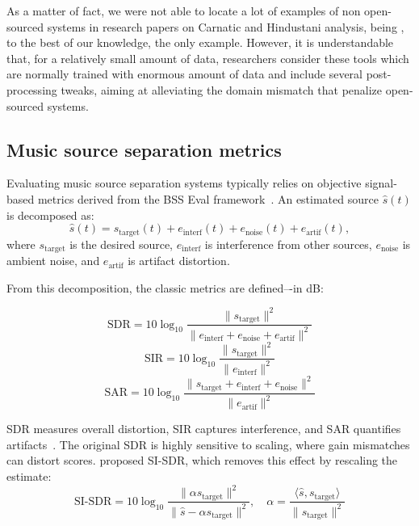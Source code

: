 As a matter of fact, we were not able to locate a lot of examples of non open-sourced systems in research papers on Carnatic and Hindustani analysis, being \citep{bhake-expressive}, to the best of our knowledge, the only example. However, it is understandable that, for a relatively small amount of data, researchers consider these tools which are normally trained with enormous amount of data and include several post-processing tweaks, aiming at alleviating the domain mismatch that penalize open-sourced systems.





\subsection{Music source separation metrics}\label{sec:source_separation_metrics}

Evaluating music source separation systems typically relies on objective signal-based metrics derived from the BSS Eval framework~\citep{vincent-metrics}. An estimated source $\hat{s}(t)$ is decomposed as:
\begin{equation}
    \hat{s}(t) = s_{\mathrm{target}}(t) + e_{\mathrm{interf}}(t) + e_{\mathrm{noise}}(t) + e_{\mathrm{artif}}(t),
\end{equation}
where $s_{\mathrm{target}}$ is the desired source, $e_{\mathrm{interf}}$ is interference from other sources, $e_{\mathrm{noise}}$ is ambient noise, and $e_{\mathrm{artif}}$ is artifact distortion.

From this decomposition, the classic metrics are defined–-in dB:

\begin{equation}
    \mathrm{SDR} = 10\log_{10} \frac{\|s_{\mathrm{target}}\|^2}{\|e_{\mathrm{interf}} + e_{\mathrm{noise}} + e_{\mathrm{artif}}\|^2}
\end{equation}
\begin{equation}
    \mathrm{SIR} = 10\log_{10} \frac{\|s_{\mathrm{target}}\|^2}{\|e_{\mathrm{interf}}\|^2}
\end{equation}
\begin{equation}
    \mathrm{SAR} = 10\log_{10} \frac{\|s_{\mathrm{target}} + e_{\mathrm{interf}} + e_{\mathrm{noise}}\|^2}{\|e_{\mathrm{artif}}\|^2}
\end{equation}

SDR measures overall distortion, SIR captures interference, and SAR quantifies artifacts~\citep{vincent-metrics}.
%
The original SDR is highly sensitive to scaling, where gain mismatches can distort scores. \citep{roux-sisdr} proposed SI-SDR, which removes this effect by rescaling the estimate:
\begin{equation}
    \mathrm{SI\text{-}SDR} = 10\log_{10} \frac{\|\alpha s_{\mathrm{target}}\|^2}{\|\hat{s} - \alpha s_{\mathrm{target}}\|^2}, \quad \alpha = \frac{\langle \hat{s}, s_{\mathrm{target}} \rangle}{\|s_{\mathrm{target}}\|^2}
\end{equation}


